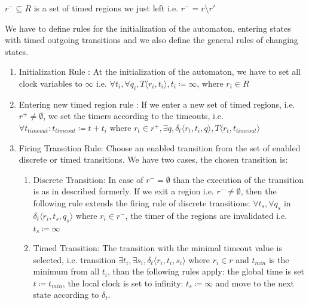 				$r^- \subseteq R$ is a set of timed regions we just left
				i.e. $r^- = r \setminus r'$
			
				We have to define rules for the initialization of the automaton,
				entering states with timed outgoing transitions 
				and we also define the general rules of changing states. 
				
				\begin{enumerate}
					\item Initialization Rule : At the initialization  of the automaton, we have to set all clock variables to $\infty$ 
					i.e. $\forall t_i, \forall q_i, T \langle r_i, t_i \rangle, t_i \coloneqq \infty $, where $r_i \in R$
				
					\item Entering new timed region rule :
					If we enter a new set of timed regions, 
					i.e. $r^+ \neq \emptyset$, 
					we set the timers according to the timeouts, 
					i.e. $\forall t_{timeout} : t_{timeout} \coloneqq t + t_i $ where $ r_t \in r^+, \exists q ,\delta_t\langle  r_t,t_i,q \rangle, T \langle r_t, t_{timeout} \rangle$
					
					\item Firing Transition Rule: Choose an enabled transition from the set of enabled discrete or timed transitions. 
					We have two cases, the chosen transition is:
						\begin{enumerate}
							\item Discrete Transition: In case of $r^- = \emptyset$ than the execution of the transition is as in described formerly. 
								If we exit a region i.e. $r^- \neq \emptyset$, 
								then the following rule extends the firing rule of discrete transitions:
								$\forall t_s, \forall q_s$ in $ \delta_t \langle r_i, t_s, q_s \rangle$ where $r_i \in r^-$, the timer of the regions are invalidated i.e.
								$t_s \coloneqq \infty$
							\item Timed Transition: The transition with the minimal timeout value is selected, 
								 i.e. transition $\exists t_i, \exists s_i, \delta_t \langle r_i, t_i, s_i \rangle$ where $ r_i \in r$ and $t_{min}$ is the minimum from all $t_i$,
								 than the following rules apply:
								 the global time is set $t \coloneqq t_{min}$, 
								 the local clock is set to infinity: $t_s \coloneqq \infty$ 
								 and move to the next state according to $\delta_t$.
						\end{enumerate}			
				\end{enumerate}
				
